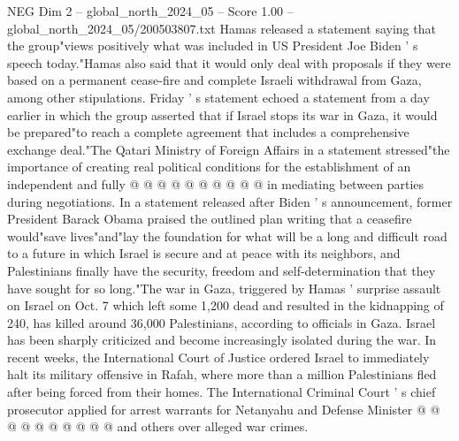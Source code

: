 \begin{textsample}{NEG Dim 2 – global\_north\_2024\_05 – Score 1.00 – global\_north\_2024\_05/200503807.txt}
Hamas released a statement saying that the group"views positively what was included in US President Joe Biden ' s speech today."Hamas also said that it would only deal with proposals if they were based on a permanent cease-fire and complete Israeli withdrawal from Gaza, among other stipulations.
Friday ' s statement echoed a statement from a day earlier in which the group asserted that if Israel stops its war in Gaza, it would be prepared"to reach a complete agreement that includes a comprehensive exchange deal."The Qatari Ministry of Foreign Affairs in a statement stressed"the importance of creating real political conditions for the establishment of an independent and fully @ @ @ @ @ @ @ @ @ @ in mediating between parties during negotiations.
In a statement released after Biden ' s announcement, former President Barack Obama praised the outlined plan writing that a ceasefire would"save lives"and"lay the foundation for what will be a long and difficult road to a future in which Israel is secure and at peace with its neighbors, and Palestinians finally have the security, freedom and self-determination that they have sought for so long."The war in Gaza, triggered by Hamas ' surprise assault on Israel on Oct. 7 which left some 1,200 dead and resulted in the kidnapping of 240, has killed around 36,000 Palestinians, according to officials in Gaza.
Israel has been sharply criticized and become increasingly isolated during the war.
In recent weeks, the International Court of Justice ordered Israel to immediately halt its military offensive in Rafah, where more than a million Palestinians fled after being forced from their homes.
The International Criminal Court ' s chief prosecutor applied for arrest warrants for Netanyahu and Defense Minister @ @ @ @ @ @ @ @ @ @ and others over alleged war crimes.

\end{textsample}

